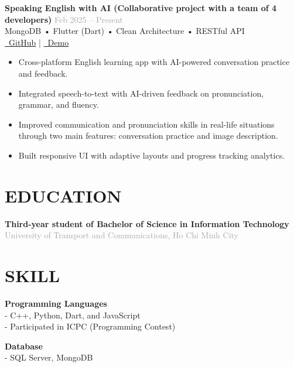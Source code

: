 \documentclass[10pt,a4paper]{article}
\newcommand{\projectitem}[5]{%
    \noindent\begin{tcolorbox}[
        colback=white,
        colframe=lightgray,
        boxrule=0.3pt,
        arc=2pt,
        top=3pt,
        bottom=3pt,
        left=6pt,
        right=6pt
    ]
        \noindent\textbf{\color{primary}#1} \hfill \textcolor{darkgray}{\scriptsize#2}\\[1pt]
        {\small\color{secondary}#3}\\[1pt]
        {\scriptsize\color{darkgray}#4}\\[3pt]
        #5
    \end{tcolorbox}
}
\begin{document}
\projectitem{Speaking English with AI (Collaborative project with a team of 4 developers)}{Feb 2025 -- Present}
    {MongoDB • Flutter (Dart) • Clean Architecture • RESTful API}
    {\href{https://github.com/dungken/speaking_english_with_ai_app}{\textcolor{secondary}{\faGithub\ GitHub}} | \href{YOUR_YOUTUBE_DEMO_LINK}{\textcolor{secondary}{\faYoutube\ Demo}}}
    {\begin{itemize}[leftmargin=12pt,itemsep=1pt,parsep=0pt,topsep=0pt,after=\vspace{-2pt},label={•}]
        \item Cross-platform English learning app with AI-powered conversation practice and feedback.
        \item Integrated speech-to-text with AI-driven feedback on pronunciation, grammar, and fluency.
        \item Improved communication and pronunciation skills in real-life situations through two main features: conversation practice and image description.
        \item Built responsive UI with adaptive layouts and progress tracking analytics.
    \end{itemize}}

\vspace{6pt}

\section{EDUCATION}
\noindent\textbf{Third-year student of Bachelor of Science in Information Technology} \hfill \textcolor{darkgray}{\small}\\[1pt]
\textcolor{darkgray}{\small University of Transport and Communications, Ho Chi Minh City}

\vspace{6pt}

\section{SKILL}
\begin{minipage}[t]{0.5\textwidth}
    \textbf{\small Programming Languages} \\[1pt]
    - C++, Python, Dart, and JavaScript \\
    - Participated in ICPC (Programming Contest) \\
\end{minipage}%
\begin{minipage}[t]{0.5\textwidth}
    \textbf{\small Database} \\[1pt]
    - SQL Server, MongoDB
\end{minipage}
\end{document}
